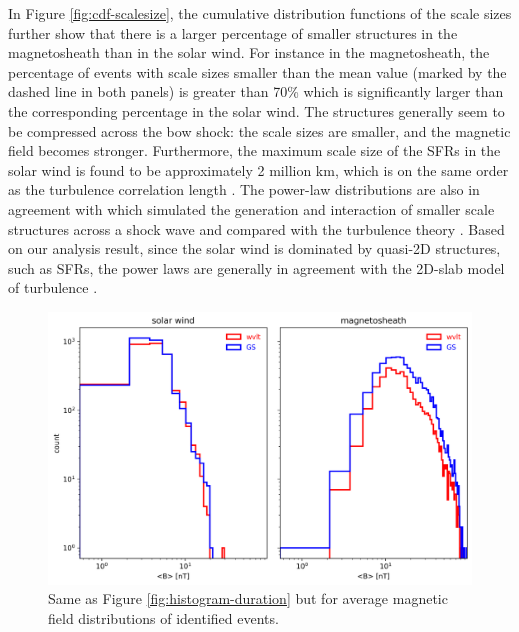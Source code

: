 In Figure \ref{fig:cdf-scalesize}, the cumulative distribution functions of the scale sizes further show that there is a larger percentage of smaller structures in the magnetosheath than in the solar wind. For instance in the magnetosheath, the percentage of events with scale sizes smaller than the mean value (marked by the dashed line in both panels) is greater than 70\% which is significantly larger than the corresponding percentage in the solar wind. The structures generally seem to be compressed across the bow shock: the scale sizes are smaller, and the magnetic field becomes stronger. Furthermore, the maximum scale size of the SFRs in the solar wind is found to be approximately 2 million km, which is on the same order as the turbulence correlation length \citep{Horbury:1996}. The power-law distributions are also in agreement with \citep{Nakanotani:2022, Nakanotani2:2022} which simulated the generation and interaction of smaller scale structures across a shock wave and compared with the turbulence theory \citep{Zank:2021, Zank:2017}. Based on our analysis result, since the solar wind is dominated by quasi-2D structures, such as SFRs, the power laws are generally in agreement with the 2D-slab model of turbulence \citep{Zank:2021, Zank:2017}.


\begin{figure}
    \centering
    \includegraphics[width=\textwidth]{Figures/Histograms/histogram_Bfield.png}
    \caption[Histograms of average magnetic field for identified events]{Same as Figure \ref{fig:histogram-duration} but for average magnetic field distributions of identified events.}
    \label{fig:histogram-Bfield}
\end{figure}

